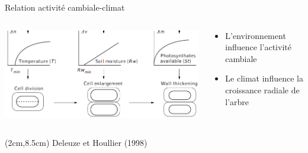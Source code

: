 \documentclass{beamer}
\begin{document}
\begin{frame}{Relation activité cambiale-climat}
	\begin{columns}
		
		\begin{column}{0.6\textwidth}
			\includegraphics[width=\textwidth]{cambimDeluze1998}
		\end{column}
		
		\begin{column}{0.4\textwidth}
			\begin{itemize} 
				\item L'environnement influence l'activité cambiale\\
				\vspace{0.5cm}
				\item Le climat influence la croissance radiale de l'arbre\\
			\end{itemize}	
		\end{column}
		
	\end{columns}
	
	\begin{textblock*}{10cm}(2cm,8.5cm)
		\tiny Deleuze et Houllier (1998)
	\end{textblock*}
\end{frame}
\end{document}
